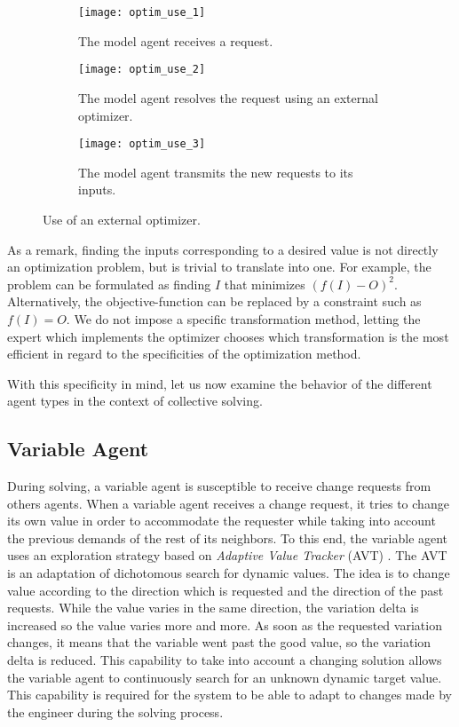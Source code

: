 \begin{figure}
	\centering
	\begin{subfigure}[b]{0.32\textwidth}
		\centering
		\texttt{[image: optim\_use\_1]}
		\caption{The model agent receives a request.}\label{optim_use:1}
	\end{subfigure}
	\hfill
	\begin{subfigure}[b]{0.32\textwidth}
		\centering
		\texttt{[image: optim\_use\_2]}
		\caption{The model agent resolves the request using an external optimizer.}\label{optim_use:2}
	\end{subfigure}
	\hfill
	\begin{subfigure}[b]{0.32\textwidth}
		\centering
		\texttt{[image: optim\_use\_3]}
		\caption{The model agent transmits the new requests to its inputs.}\label{optim_use:3}
	\end{subfigure}
	\caption{Use of an external optimizer.}\label{optim_use}
\end{figure}

As a remark, finding the inputs corresponding to a desired value is not directly an optimization problem, but is trivial to translate into one. For example, the problem can be formulated as finding $I$ that minimizes $(f(I) - O)^2$. Alternatively, the objective-function can be replaced by a constraint such as $f(I) = O$. We do not impose a specific transformation method, letting the expert which implements the optimizer chooses which transformation is the most efficient in regard to the specificities of the optimization method.

With this specificity in mind, let us now examine the behavior of the different agent types in the context of collective solving.

\subsection{Variable Agent}\label{variable_agent_solving}

During solving, a variable agent is susceptible to receive change requests from others agents. When a variable agent receives a change request, it tries to change its own value in order to accommodate the requester while taking into account the previous demands of the rest of its neighbors. To this end, the variable agent uses an exploration strategy based on \emph{Adaptive Value Tracker} (AVT) \cite{Lemouzy_2011}. The AVT is an adaptation of dichotomous search for dynamic values. The idea is to change value according to the direction which is requested and the direction of the past requests. While the value varies in the same direction, the variation delta is increased so the value varies more and more. As soon as the requested variation changes, it means that the variable went past the good value, so the variation delta is reduced.
This capability to take into account a changing solution allows the variable agent to continuously search for an unknown dynamic target value. This capability is required for the system to be able to adapt to changes made by the engineer during the solving process.

